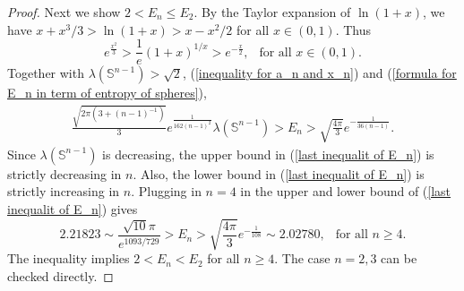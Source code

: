 \documentclass[12pt]{amsart}
\numberwithin{equation}{section}
\theoremstyle{remark}
\begin{document}
\begin{proof}
		Next we show $2< E_n \le E_2$. By the Taylor expansion of $\ln (1+x)$, we have $ x + x^3/3 >\ln (1+x) > x - x^2/2$ for all $x\in (0,1)$. Thus
		$$e^{\frac{x^2}{3}} > \frac{1}{e} (1+x)^{1/x} > e^{-\frac{x}{2}}, \ \ \text{ for all } x\in (0,1).$$
		Together with $\lambda (\mathbb{S}^{n-1}) > \sqrt 2$, (\ref{inequality for a_n and x_n}) and (\ref{formula for E_n in term of entropy of spheres}),
		\begin{align} \label{last inequalit of E_n}
			\frac{\sqrt{2\pi(3+(n-1)^{-1})}}{3} e^{\frac{1}{162 (n-1)^2}} \lambda (\mathbb{S}^{n-1}) >  E_n >  \sqrt{\frac{4\pi}{3}}e^{-\frac{1}{36(n-1)}}. 
		\end{align}
		Since $\lambda (\mathbb{S}^{n-1})$ is decreasing, the upper bound in (\ref{last inequalit of E_n}) is strictly decreasing in $n$. Also, the lower bound in (\ref{last inequalit of E_n}) is strictly increasing in $n$. Plugging in $n=4$ in the upper and lower bound of (\ref{last inequalit of E_n}) gives 
		$$2.21823\sim \frac{\sqrt{10} \pi}{e^{1093/729}} > E_n > \sqrt{\frac{4\pi}{3}}e^{-\frac{1}{108}} \sim 2.02780, \ \ \text{ for all } n\ge 4.$$
		The inequality implies $2 <E_n < E_2$ for all $n\ge 4$. The case $n=2, 3$ can be checked directly. 
		
	\end{proof}
	
	
	
	
	
	
	
	
	
\end{document}
